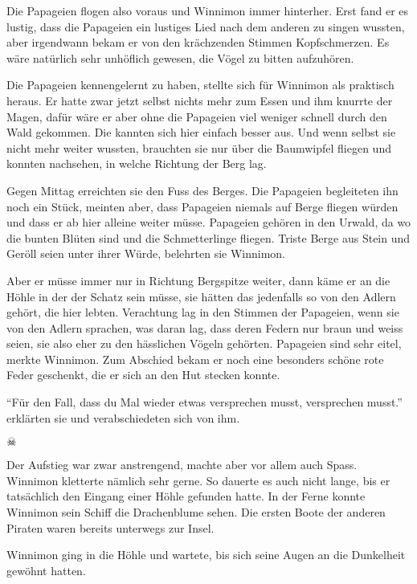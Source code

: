 Die Papageien flogen also voraus und Winnimon immer hinterher. Erst fand er es lustig, dass die Papageien ein lustiges Lied nach dem anderen zu singen wussten, aber irgendwann bekam er von den krächzenden Stimmen Kopfschmerzen. Es wäre natürlich sehr unhöflich gewesen, die Vögel zu bitten aufzuhören. 

Die Papageien kennengelernt zu haben, stellte sich für Winnimon als praktisch heraus. Er hatte zwar jetzt selbst nichts mehr zum Essen und ihm knurrte der Magen, dafür wäre er aber ohne die Papageien viel weniger schnell durch den Wald gekommen. Die kannten sich hier einfach besser aus. Und wenn selbst sie nicht mehr weiter wussten, brauchten sie nur über die Baumwipfel fliegen und konnten nachsehen, in welche Richtung der Berg lag.

Gegen Mittag erreichten sie den Fuss des Berges. Die Papageien begleiteten ihn noch ein Stück, meinten aber, dass Papageien niemals auf Berge fliegen würden und dass er ab hier alleine weiter müsse. Papageien gehören in den Urwald, da wo die bunten Blüten sind und die Schmetterlinge fliegen. Triste Berge aus Stein und Geröll seien unter ihrer Würde, belehrten sie Winnimon.

Aber er müsse immer nur in Richtung Bergspitze weiter, dann käme er an die Höhle in der der Schatz sein müsse, sie hätten das jedenfalls so von den Adlern gehört, die hier lebten. Verachtung lag in den Stimmen der Papageien, wenn sie von den Adlern sprachen, was daran lag, dass deren Federn nur braun und weiss seien, sie also eher zu den hässlichen Vögeln gehörten. Papageien sind sehr eitel, merkte Winnimon. Zum Abschied bekam er noch eine besonders schöne rote Feder geschenkt, die er sich an den Hut stecken konnte. 

\enquote{Für den Fall, dass du Mal wieder etwas versprechen musst, versprechen musst.} erklärten sie und verabschiedeten sich von ihm.

\begin{center}
{ $\skull$}
\end{center}

Der Aufstieg war zwar anstrengend, machte aber vor allem auch Spass. Winnimon kletterte nämlich sehr gerne. So dauerte es auch nicht lange, bis er tatsächlich den Eingang einer Höhle gefunden hatte. In der Ferne konnte Winnimon sein Schiff die Drachenblume sehen. Die ersten Boote der anderen Piraten waren bereits unterwegs zur Insel.


Winnimon ging in die Höhle und wartete, bis sich seine Augen an die Dunkelheit gewöhnt hatten.

